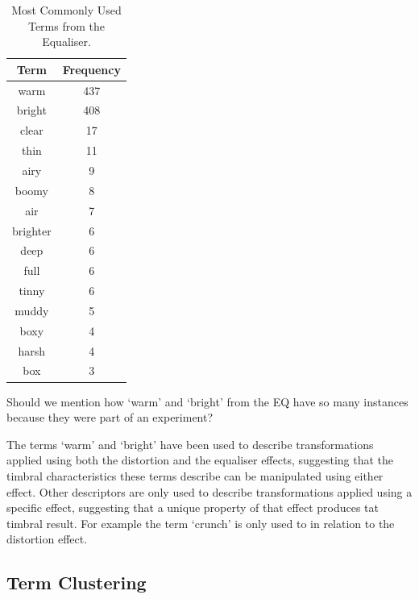 		\begin{table}[h!]
			\centering
			\begin{tabular}{|c|c|}
				\hline
				\bf{Term} & \bf{Frequency} \\
				\hline
				\hline
				warm & 437 \\
				\hline
				bright & 408 \\
				\hline
				clear & 17 \\
				\hline
				thin & 11 \\
				\hline
				airy & 9 \\
				\hline
				boomy & 8 \\
				\hline
				air & 7 \\
				\hline
				brighter & 6 \\
				\hline
				deep & 6 \\
				\hline
				full & 6 \\
				\hline
				tinny & 6 \\
				\hline
				muddy & 5 \\
				\hline
				boxy & 4 \\
				\hline
				harsh & 4 \\
				\hline
				box & 3 \\
				\hline
			\end{tabular}
			\caption{Most Commonly Used Terms from the Equaliser.}
			\label{tab:EqualiserTerms}
		\end{table}

		\note
		{
			Should we mention how `warm' and `bright' from the EQ have so many instances because they were part
			of an experiment?
		}

		The terms `warm' and `bright' have been used to describe transformations applied using both the distortion
		and the equaliser effects, suggesting that the timbral characteristics these terms describe can be
		manipulated using either effect. Other descriptors are only used to describe transformations applied using a
		specific effect, suggesting that a unique property of that effect produces tat timbral result. For example
		the term `crunch' is only used to in relation to the distortion effect.


	\subsection{Term Clustering}
	\label{sec:TimbreEvaluation-Analysis-TermClustering}

